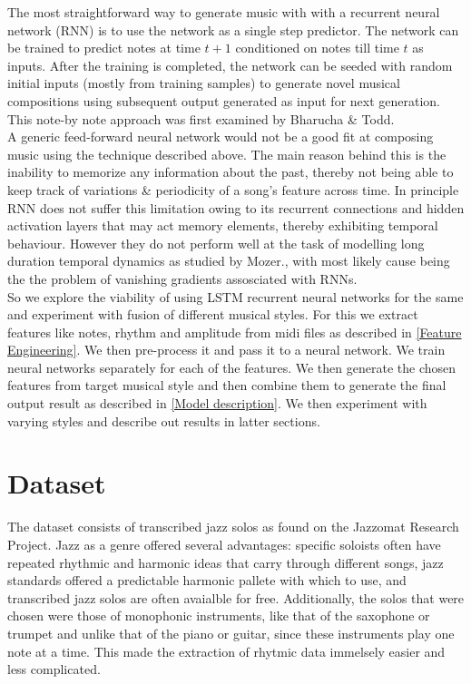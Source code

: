 \documentclass[conference]{IEEEtran}
\begin{document}
The most straightforward way to generate music with with a recurrent neural network (RNN) is to use the network as a single step predictor. The network can be trained to predict notes at time $t+1$ conditioned on notes till time $t$ as inputs. After the training is completed, the network can be seeded with random initial inputs (mostly from training samples) to generate novel musical compositions using subsequent output generated as input for next generation. This note-by note approach was first examined by Bharucha \& Todd.\cite{todd,eck}\\

A generic feed-forward neural network would not be a good fit at composing music using the technique described above. The main reason behind this is the inability to memorize any information about the past, thereby not being able to keep track of variations \& periodicity of a song's  feature across time. In principle RNN does not suffer this limitation owing to its recurrent connections and hidden activation layers that may act memory elements, thereby exhibiting temporal behaviour. However they do not perform well at the task of modelling long duration temporal dynamics as studied by Mozer.\cite{mozer}, with most likely cause being the the problem of vanishing gradients assosciated with RNNs.\cite{hochreiter}\\

So we explore the viability of using LSTM recurrent neural networks for the same and experiment with fusion of different musical styles. For this we extract features like notes, rhythm and amplitude from midi files as described in \ref{Feature Engineering}. We then pre-process it and pass it to a neural network. We train neural networks separately for each of the features. We then generate the chosen features from target musical style and then combine them to generate the final output result as described in \ref{Model description}. We then experiment with varying styles and describe out results in latter sections.

\section{Dataset}
The dataset consists of transcribed jazz solos as found on the Jazzomat Research Project. Jazz as a genre offered several advantages: specific soloists often have repeated rhythmic and harmonic ideas that carry through different songs, jazz standards offered a predictable harmonic pallete with which to use, and transcribed jazz solos are often avaialble for free. Additionally, the solos that were chosen were those of monophonic instruments, like that of the saxophone or trumpet and unlike that of the piano or guitar, since these instruments play one note at a time. This made the extraction of rhytmic data immelsely easier and less complicated.
\end{document}
